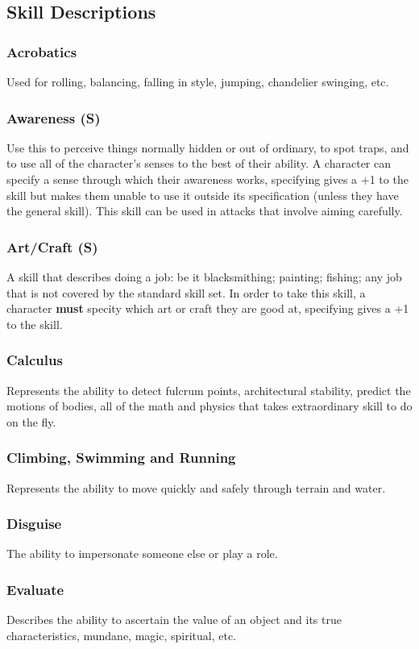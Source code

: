 \subsection{Skill Descriptions}
\begin{multicols}{2}
\subsubsection*{Acrobatics}
Used for rolling, balancing, falling in style, jumping, chandelier swinging, etc.
\subsubsection*{Awareness (S)}
Use this to perceive things normally hidden or out of ordinary, to spot traps, and to use all of the character's senses to the best of their ability. A character can specify a sense through which their awareness works, specifying gives a +1 to the skill but makes them unable to use it outside its specification (unless they have the general skill). This skill can be used in attacks that involve aiming carefully.
\subsubsection*{Art/Craft (S)}
A skill that describes doing a job: be it blacksmithing; painting; fishing; any job that is not covered by the standard skill set. In order to take this skill, a character \textbf{must} specity which art or craft they are good at, specifying gives a +1 to the skill.
\subsubsection*{Calculus}
Represents the ability to detect fulcrum points, architectural stability, predict the motions of bodies, all of the math and physics that takes extraordinary skill to do on the fly.
\subsubsection*{Climbing, Swimming and Running}
Represents the ability to move quickly and safely through terrain and water.
\subsubsection*{Disguise}
The ability to impersonate someone else or play a role.
\subsubsection*{Evaluate}
Describes the ability to ascertain the value of an object and its true characteristics, mundane, magic, spiritual, etc.

\end{multicols}
